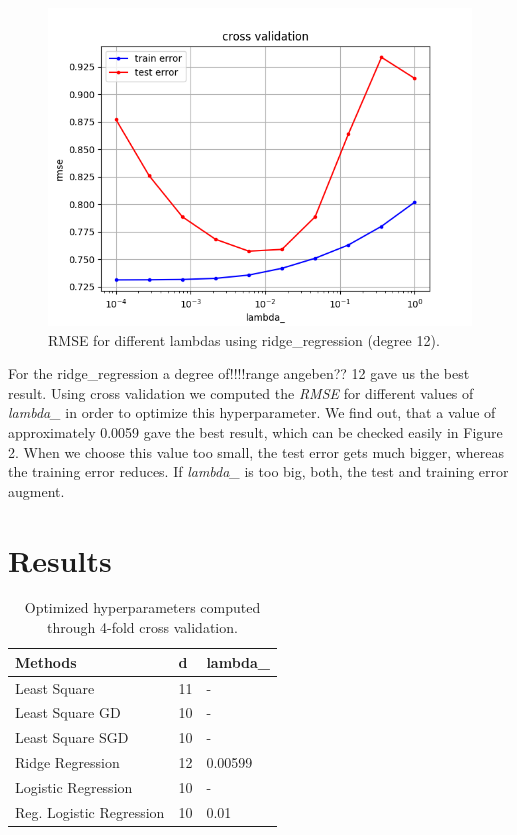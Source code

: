 \documentclass[10pt,conference,compsocconf]{IEEEtran}
\begin{document}
\begin{figure}[htbp]
	\centering
	\includegraphics[width=\columnwidth]{cross_validation_ridge_degree_12.png}
	\caption{RMSE for different lambdas using ridge\_regression (degree 12).}
	\vspace{-3mm}
	\label{fig:crossvalidationridge}
\end{figure}
 For the ridge\_regression a degree of!!!!range angeben?? 12 gave us the best result. Using cross validation we computed the \textit{RMSE} for different values of \textit{lambda\_} in order to optimize this hyperparameter. We find out, that a value of approximately 0.0059 gave the best result, which can be checked easily in Figure 2. When we choose this value too small, the test error gets much bigger, whereas the training error reduces. If \textit{lambda\_} is too big, both, the test and training error augment.\\

\section{Results}

\begin{table}[htbp]
	\centering
	\begin{tabular}[c]{|l||l|l|}
		\hline
		Methods&d&lambda\_\\
		\hline
		Least Square& 11 &-\\
		Least Square GD& 10 & -\\
		Least Square SGD & 10 &-\\		Ridge Regression&12&0.00599\\
		Logistic Regression & 10&-\\
		Reg. Logistic Regression&10&0.01\\
		\hline
	\end{tabular}
	\caption{Optimized hyperparameters computed\\ through 4-fold cross validation.}
	\label{tab:hyperpam}
\end{table}
\end{document}
